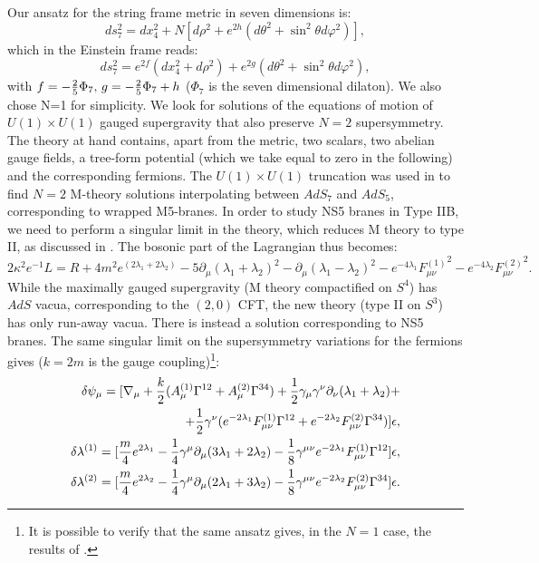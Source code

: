 \documentclass[a4paper,12pt]{article}
\begin{document}
Our ansatz for the string frame metric in seven dimensions is: 
\begin{equation}
ds_{7}^2 = dx_{4}^2 + N[d\rho^2 + e^{2h}(d\theta^2 + \sin^{2}\theta d\varphi^2)],
\label{m1}
\end{equation}
which in the Einstein frame reads:
\begin{equation}
ds_{7}^2 = e^{2f}(dx_{4}^2 + d\rho^2) + e^{2g}(d\theta^2 + \sin^{2}\theta d\varphi^2),
\label{m2}
\end{equation}
with $f=-{2\over5}\Phi_{7},\, 
g= -{2\over5}\Phi_{7} + h$ ($\Phi_{7}$ is the seven dimensional dilaton). 
We also chose N=1 for simplicity.
We  look for solutions of the equations of motion of  $U(1)\times U(1)$ gauged supergravity that also preserve $ N =2$ supersymmetry. The theory at hand contains, apart from the metric, two scalars, two abelian gauge fields, a tree-form potential (which we take equal to zero in the following) and the corresponding fermions. 
The $U(1)\times U(1)$ truncation was used in \cite{mn1} to find $N=2$ M-theory solutions
interpolating between $AdS_{7}$ and $AdS_{5}$, corresponding to wrapped M5-branes.
In order to study NS5 branes in Type IIB, we need to perform a singular
limit in the theory, which reduces M theory to type II,
 as discussed in \cite{cve2}. The bosonic part of the
Lagrangian thus becomes:
\begin{equation}
2\kappa^{2}e^{-1}L = R +4m^2e^{(2\lambda_{1}+2\lambda_{2})} - 5\partial_{\mu}(\lambda_{1}+\lambda_{2})^2 - \partial_{\mu}(\lambda_{1}-\lambda_{2})^2 - e^{-4\lambda_{1}}{F_{\mu\nu}^{(1)}}^{2}- e^{-4\lambda_{2}}{F_{\mu\nu}^{(2)}}^{2}.
\end{equation}
While the maximally gauged supergravity (M theory compactified on $S^4$)
has $AdS$ vacua, corresponding to the $(2,0)$ CFT, the new theory
(type II on $S^3$) has only run-away vacua. There is instead a solution
corresponding to NS5 branes.
The same singular limit on the supersymmetry variations for the fermions gives ($k=2m$ is the gauge coupling)\footnote{It is possible to verify that the same ansatz gives, in the $N=1$ case, the results of \cite{mn2}.}:
\begin{eqnarray}
\delta\psi_{\mu}= [\nabla_{\mu}+ {k\over2}(A_{\mu}^{(1)}\Gamma^{12}+A_{\mu}^{(2)}\Gamma^{34}) + {1\over2}\gamma_{\mu}\gamma^{\nu}\partial_{\nu}(\lambda_{1} + \lambda_{2}) + \nonumber \\
+{1\over2}\gamma^{\nu}(e^{-2\lambda_{1}}F_{\mu\nu}^{(1)}\Gamma^{12}+ e^{-2\lambda_{2}}F_{\mu\nu}^{(2)}\Gamma^{34})]\epsilon , \nonumber \\
\delta{\lambda^{(1)}}= [{m\over4}e^{2\lambda_{1}}-{1\over4}\gamma^{\mu}\partial_{\mu}(3\lambda_{1}+2\lambda_{2})-{1\over8}\gamma^{\mu\nu}e^{-2\lambda_{1}}F_{\mu\nu}^{(1)}\Gamma^{12}]\epsilon , \nonumber \\
\delta {\lambda^{(2)}}= [{m\over4}e^{2\lambda_{2}}-{1\over4}\gamma^{\mu}\partial_{\mu}(2\lambda_{1}+3\lambda_{2})-{1\over8}\gamma^{\mu\nu}e^{-2\lambda_{2}}F_{\mu\nu}^{(2)}\Gamma^{34}]\epsilon .
\label{fermi}
\end{eqnarray} 
\end{document}
